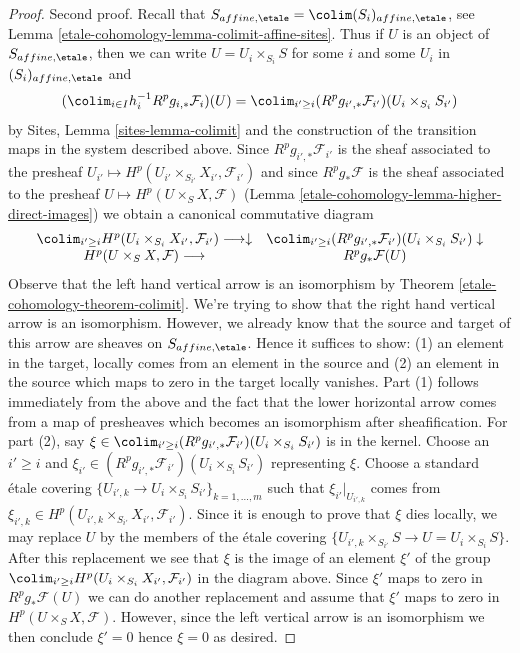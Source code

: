 \begin{proof}
\medskip\noindent
Second proof.
Recall that $S_{affine, \etale} = \colim (S_i)_{affine, \etale}$, see
Lemma \ref{etale-cohomology-lemma-colimit-affine-sites}. Thus if $U$ is an object of
$S_{affine, \etale}$, then we can write $U = U_i \times_{S_i} S$
for some $i$ and some $U_i$ in $(S_i)_{affine, \etale}$ and
$$
(\colim_{i \in I} h_i^{-1}R^p g_{i, *} \mathcal{F}_i)(U) =
\colim_{i' \geq i} (R^p g_{i', *}\mathcal{F}_{i'})(U_i \times_{S_i} S_{i'})
$$
by Sites, Lemma \ref{sites-lemma-colimit} and the construction of the
transition maps in the system described above. Since
$R^pg_{i', *}\mathcal{F}_{i'}$ is the sheaf associated to the presheaf
$U_{i'} \mapsto H^p(U_{i'} \times_{S_{i'}} X_{i'}, \mathcal{F}_{i'})$
and since $R^pg_*\mathcal{F}$ is the sheaf associated to the presheaf
$U \mapsto H^p(U \times_S X, \mathcal{F})$
(Lemma \ref{etale-cohomology-lemma-higher-direct-images})
we obtain a canonical commutative diagram
$$
\begin{array}{cc}\colim_{i' \geq i}
H^p(U_i \times_{S_i} X_{i'}, \mathcal{F}_{i'}) \longrightarrow\downarrow & \colim_{i' \geq i}
(R^p g_{i', *}\mathcal{F}_{i'})(U_i \times_{S_i} S_{i'}) \downarrow \\ H^p(U \times_S X, \mathcal{F}) \longrightarrow & R^pg_*\mathcal{F}(U)\end{array}
$$
Observe that the left hand vertical arrow is an isomorphism
by Theorem \ref{etale-cohomology-theorem-colimit}. We're trying to show that
the right hand vertical arrow is an isomorphism. However, we
already know that the source and target of this arrow
are sheaves on $S_{affine, \etale}$. Hence it suffices to
show: (1) an element in the target, locally comes from an
element in the source and (2) an element in the source
which maps to zero in the target locally vanishes.
Part (1) follows immediately from the above and the fact that
the lower horizontal arrow comes from a map of presheaves
which becomes an isomorphism after sheafification.
For part (2), say $\xi \in  \colim_{i' \geq i}
(R^p g_{i', *}\mathcal{F}_{i'})(U_i \times_{S_i} S_{i'})$
is in the kernel. Choose an $i' \geq i$ and
$\xi_{i'} \in (R^p g_{i', *}\mathcal{F}_{i'})(U_i \times_{S_i} S_{i'})$
representing $\xi$.
Choose a standard \'etale covering
$\{U_{i', k} \to U_i \times_{S_i} S_{i'}\}_{k = 1, \ldots, m}$
such that $\xi_{i'}|_{U_{i', k}}$ comes from
$\xi_{i', k} \in H^p(U_{i', k} \times_{S_{i'}} X_{i'}, \mathcal{F}_{i'})$.
Since it is enough to prove that $\xi$ dies locally, we
may replace $U$ by the members of the \'etale
covering $\{U_{i', k} \times_{S_{i'}} S \to U = U_i \times_{S_i} S\}$.
After this replacement we see that $\xi$ is the image of
an element $\xi'$ of the group
$\colim_{i' \geq i} H^p(U_i \times_{S_i} X_{i'}, \mathcal{F}_{i'})$
in the diagram above. Since $\xi'$ maps to zero in $R^pg_*\mathcal{F}(U)$
we can do another replacement and assume that $\xi'$ maps
to zero in $H^p(U \times_S X, \mathcal{F})$.
However, since the left vertical arrow is an isomorphism
we then conclude $\xi' = 0$ hence $\xi = 0$ as desired.
\end{proof}

